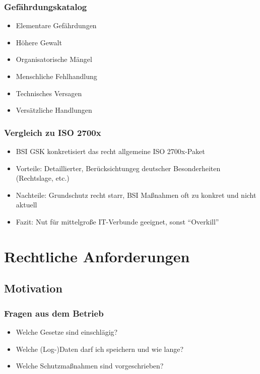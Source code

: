 \subsubsection{Gefährdungskatalog}
\begin{itemize}
	\item Elementare Gefährdungen
	\item Höhere Gewalt
	\item Organisatorische Mängel
	\item Menschliche Fehlhandlung
	\item Technisches Versagen
	\item Versätzliche Handlungen
\end{itemize}

\subsubsection{Vergleich zu ISO 2700x}
\begin{itemize}
	\item BSI GSK konkretisiert das recht allgemeine ISO 2700x-Paket
	\item Vorteile: Detaillierter, Berücksichtungeg deutscher Besonderheiten (Rechtslage, etc.)
	\item Nachteile: Grundschutz recht starr, BSI Maßnahmen oft zu konkret und nicht aktuell
	\item Fazit: Nut für mittelgroße IT-Verbunde geeignet, sonst "`Overkill"'
\end{itemize}



\section{Rechtliche Anforderungen}

\subsection{Motivation}

\subsubsection{Fragen aus dem Betrieb}
\begin{itemize}
	\item Welche Gesetze sind einschlägig?
	\item Welche (Log-)Daten darf ich speichern und wie lange?
	\item Welche Schutzmaßnahmen sind vorgeschrieben?
\end{itemize}

